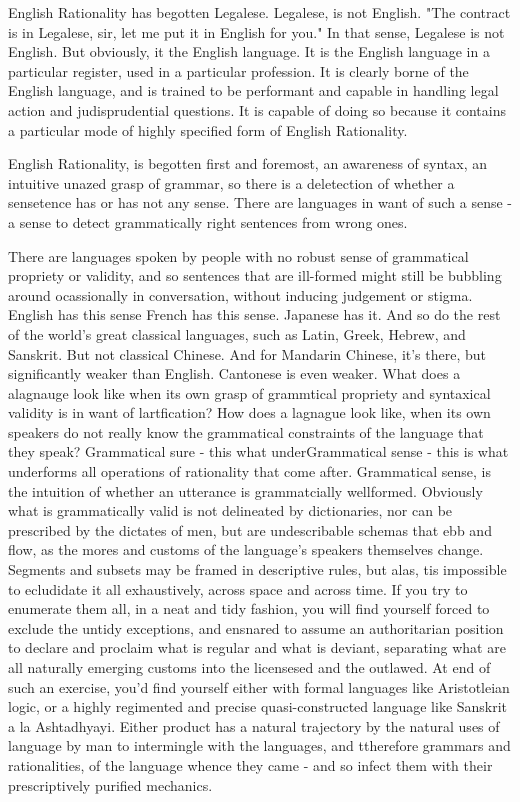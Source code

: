 \separator
English Rationality has begotten Legalese. Legalese, is not English. "The contract is in Legalese, sir, let me put it in English for you." In that sense, Legalese is not English. But obviously, it the English language. It is the English language in a particular register, used in a particular profession. It is clearly borne of the English language, and is trained to be performant and capable in handling legal action and judisprudential questions. It is capable of doing so because it contains a particular mode of highly specified form of English Rationality. 


\separator

English Rationality, is begotten first and foremost, an awareness of syntax,  an intuitive unazed grasp of grammar, so there is a deletection of whether a sensetence has or has not any sense. There are languages in want of such a sense - a sense to detect grammatically right sentences from wrong ones. 

There are languages spoken by people with no robust sense of grammatical propriety or validity, and so sentences that are ill-formed might still be bubbling around ocassionally in conversation, without inducing judgement or stigma. English has this sense French has this sense. Japanese has it. And so do the rest of the world's great classical languages, such as Latin, Greek, Hebrew, and Sanskrit. But not classical Chinese. And for Mandarin Chinese, it's there, but significantly weaker than English. Cantonese is even weaker. What does a alagnauge look like when its own grasp of grammtical propriety and syntaxical validity is in want of lartfication? How does a lagnague look like, when its own speakers do not really  know the grammatical constraints of the language that they speak? Grammatical sure - this what underGrammatical sense - this is what underforms all operations of rationality that come after. Grammatical sense, is the intuition of whether an utterance is grammatcially wellformed. Obviously what is grammatically valid is not delineated by dictionaries, nor can be prescribed by the dictates of men, but are undescribable schemas that ebb and flow, as the mores and customs of the language's speakers themselves change. Segments and subsets may be framed in descriptive rules, but alas, tis impossible to ecludidate it all exhaustively, across space and across time. If you try to enumerate them all, in a neat and tidy fashion, you will find yourself forced to exclude the untidy exceptions, and ensnared to assume an authoritarian position to declare and proclaim what is regular and what is deviant, separating what are all naturally emerging customs into the licensesed and the outlawed. At end of such an exercise, you'd find yourself either with formal languages like Aristotleian logic, or a highly regimented and precise quasi-constructed language like Sanskrit a la Ashtadhyayi. Either product has a natural trajectory by the natural uses of language by man to intermingle with the languages, and ttherefore grammars and rationalities, of the language whence they came - and so infect them with their prescriptively purified mechanics. 


